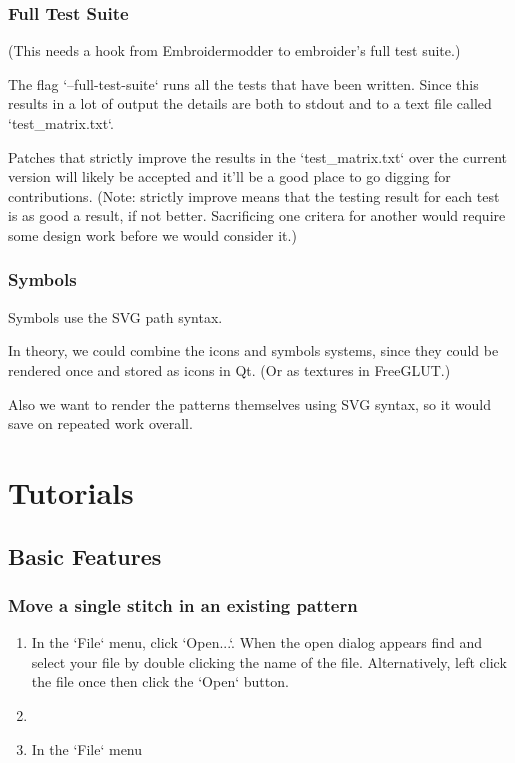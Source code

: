 \documentclass{report}
\begin{document}
\subsection{Full Test Suite}

(This needs a hook from Embroidermodder to embroider's full test suite.)

The flag `--full-test-suite` runs all the tests that have been written.
Since this results in a lot of output the details are both to stdout
and to a text file called `test\_matrix.txt`.

Patches that strictly improve the results in the `test\_matrix.txt` over
the current version will likely be accepted and it'll be a good place
to go digging for contributions. (Note: strictly improve means that
the testing result for each test is as good a result, if not better.
Sacrificing one critera for another would require some design work
before we would consider it.)

\subsection{Symbols}

Symbols use the SVG path syntax.

In theory, we could combine the icons and symbols systems, since they could be rendered once and stored as icons in Qt. (Or as textures in FreeGLUT.)

Also we want to render the patterns themselves using SVG syntax, so it would save on repeated work overall.

\chapter{Tutorials}

\section{Basic Features}

\subsection{Move a single stitch in an existing pattern}

\begin{enumerate}
\item In the `File` menu, click `Open...`. When the open dialog appears find and select your file by double clicking the name of the file. Alternatively, left click the file once then click the `Open` button.
\item
\item In the `File` menu
\end{enumerate}
\end{document}
